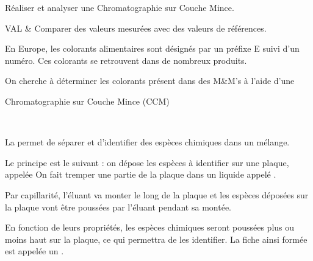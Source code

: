 \teteSndCorp

\nomPrenomClasse
{}


\begin{objectifs}
  \item Réaliser et analyser une Chromatographie sur Couche Mince.
\end{objectifs}


\begin{tableauCompetences}
  VAL & Comparer des valeurs mesurées avec des valeurs de références.
\end{tableauCompetences}



\begin{contexte}
  En Europe, les colorants alimentaires sont désignés par un préfixe E suivi d'un numéro.
  Ces colorants se retrouvent dans de nombreux produits.
  
  On cherche à déterminer les colorants présent dans des M\&M's à l'aide d'une 
\end{contexte}


\begin{doc}{Chromatographie sur Couche Mince (CCM)}
  \begin{figure}
    \centering
    \vspace*{-16pt}
     \\
  \end{figure}

  La  permet de séparer et d'identifier des espèces chimiques dans un mélange.

  Le principe est le suivant : on dépose les espèces à identifier sur une plaque, appelée  On fait tremper une partie de la plaque dans un liquide appelé .
  
  Par capillarité, l'éluant va monter le long de la plaque et les espèces déposées sur la plaque vont être poussées par l'éluant pendant sa montée.
  
  En fonction de leurs propriétés, les espèces chimiques seront poussées plus ou moins haut sur la plaque, ce qui permettra de les identifier.
  La fiche ainsi formée est appelée un .
\end{doc}


